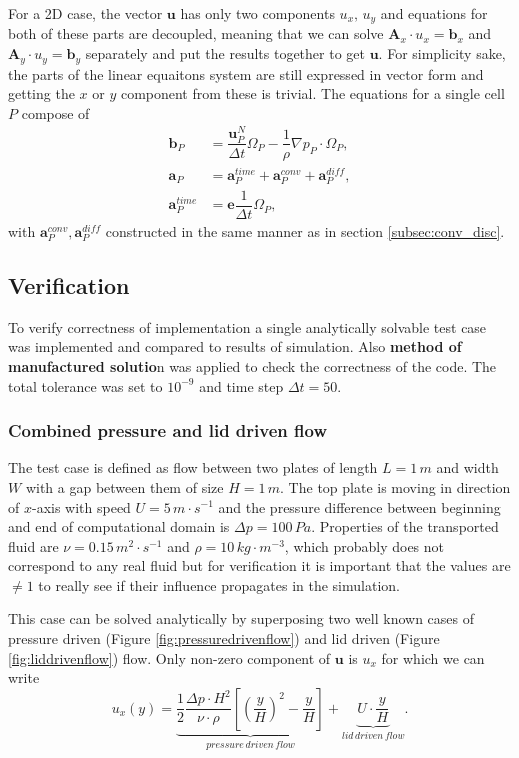 \documentclass[]{article}
\begin{document}
For a 2D case, the vector $ \mathbf{u} $ has only two components $ u_x,\,u_y $ and equations for both of these parts are decoupled, meaning that we can solve $ \mathbf{A}_x\cdot u_x = \mathbf{b}_x $ and $ \mathbf{A}_y \cdot u_y = \mathbf{b}_y $ separately and put the results together to get $ \mathbf{u}$. For simplicity sake, the parts of the linear equaitons system are still expressed in vector form and getting the $ x $ or $ y $ component from these is trivial. The equations for a single cell $ P $ compose of
\begin{align}
\mathbf{b}_P &= \dfrac{\mathbf{u}^N_P}{\Delta t} \Omega_{P}- \dfrac{1}{\rho} \nabla p_P \cdot \Omega_P,\\
\mathbf{a}_P &= \mathbf{a}_{P}^{time} + \mathbf{a}_{P}^{conv} +\mathbf{a}_{P}^{diff}, \\
\mathbf{a}_{P}^{time}&=\mathbf{e}\dfrac{1}{\Delta t}\Omega_P,
\end{align}
with $ \mathbf{a}_{P}^{conv}, \mathbf{a}_{P}^{diff} $ constructed in the same manner as in section \ref{subsec:conv_disc}.

\subsection{Verification}
To verify correctness of implementation a single analytically solvable test case was implemented and compared to results of simulation. Also \textbf{method of manufactured solutio}n was applied to check the correctness of the code. The total tolerance was set to $ 10^{-9} $ and time step $ \Delta t = 50 $.

\subsubsection{Combined pressure and lid driven flow}
The test case is defined as flow between two plates of length $ L=1\,m $ and width $ W $ with a gap between them of size $ H=1\,m $. The top plate is moving in direction of $ x $-axis with speed $ U = 5\, m\cdot s^{-1} $ and the pressure difference between beginning and end of computational domain is $ \Delta p = 100\, Pa $. Properties of the transported fluid are $ \nu = 0.15 \, m^2\cdot s^{-1} $ and $ \rho=10 \,kg\cdot m^{-3} $, which probably does not correspond to any real fluid but for verification it is important that the values are $ \neq 1 $ to really see if their influence propagates in the simulation. 

This case can be solved analytically by superposing two well known cases of pressure driven (Figure \ref{fig:pressuredrivenflow}) and lid driven (Figure \ref{fig:liddrivenflow}) flow. Only non-zero component of $ \mathbf{u} $ is $ u_x $ for which we can write 
\begin{equation}\label{eq:pressure_lid_analytical}
u_x(y)= \underbrace{\dfrac{1}{2}\dfrac{\Delta p \cdot H^2}{\nu\cdot \rho} \left[ \left(\dfrac{y}{H}\right)^2 - \dfrac{y}{H} \right] }_{pressure\, driven \, flow} + \underbrace{U \cdot \dfrac{y}{H}}_{lid \,driven \,flow}. 
\end{equation}
\end{document}
